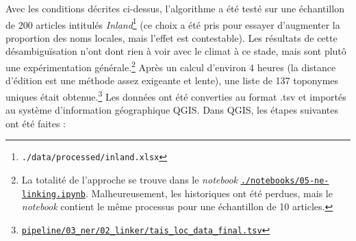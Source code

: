\documentclass[a4paper,twoside,12pt]{article}
\begin{document}
Avec les conditions décrites ci-dessus, l'algorithme a été testé sur une échantillon de 200 articles intitulés \textit{Inland}\footnote{\texttt{./data/processed/inland.xlsx}} (ce choix a été pris pour essayer d'augmenter la proportion des noms locales, mais l'effet est contestable). Les résultats de cette désambiguïsation n'ont dont rien à voir avec le climat à ce stade, mais sont plutô une expérimentation générale.\footnote{La totalité de l'approche se trouve dans le \textit{notebook} \href{https://github.com/krkryger/clim-dist/blob/main/notebooks/05-ne-linking.ipynb}{\texttt{./notebooks/05-ne-linking.ipynb}}. Malheureusement, les historiques ont été perdues, mais le \textit{notebook} contient le même processus pour une échantillon de 10 articles.} Après un calcul d'environ 4 heures (la distance d'édition est une méthode assez exigeante et lente), une liste de 137 toponymes uniques était obtenue.\footnote{\href{https://github.com/krkryger/clim-dist/blob/main/pipeline/03_ner/02_linker/tais_loc_data_final.tsv}{\texttt{pipeline/03\_ner/02\_linker/tais\_loc\_data\_final.tsv}}} Les données ont été converties au format .tsv et importés au système d'information géographique QGIS. Dans QGIS, les étapes suivantes ont été faites :
\vspace{1ex}
\end{document}
